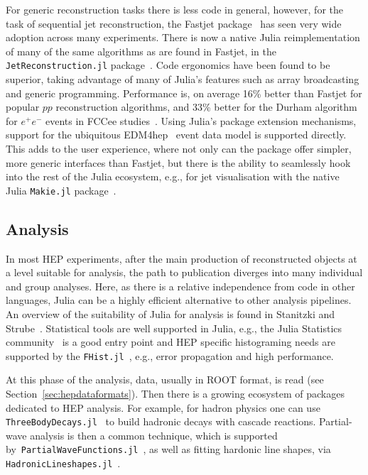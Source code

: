 \documentclass{webofc}
\begin{document}
For generic reconstruction tasks there is less code in general, however, for the
task of sequential jet reconstruction, the Fastjet
package~\cite{Cacciari:2011ma} has seen very wide adoption across many
experiments. There is now a native Julia reimplementation of many of the same
algorithms as are found in Fastjet, in the \texttt{JetReconstruction.jl}
package~\cite{polyglot-jets-conference,stewart_2025_14945660}. Code ergonomics
have been found to be superior, taking advantage of many of Julia's features
such as array broadcasting and generic programming. Performance is, on average
16\% better than Fastjet for popular $pp$ reconstruction algorithms, and 33\%
better for the Durham algorithm for $e^+e^-$ events in FCCee
studies~\cite{fast-jet-reco-julia}. Using Julia's package extension mechanisms,
support for the ubiquitous EDM4hep~\cite{Gaede:2022leb} event data model is
supported directly. This adds to the user experience, where not only can the
package offer simpler, more generic interfaces than Fastjet, but there is the
ability to seamlessly hook into the rest of the Julia ecosystem, e.g., for jet
visualisation with the native Julia \texttt{Makie.jl}
package~\cite{Danisch2021}.

\subsection{Analysis}

In most HEP experiments, after the main production of reconstructed objects at a
level suitable for analysis, the path to publication
diverges into many individual and group analyses. Here, as
there is a relative independence from code in other languages, Julia can be a
highly efficient alternative to other analysis pipelines. An overview of the
suitability of Julia for analysis is found in Stanitzki and
Strube~\cite{Stanitzki:2020bnx}. Statistical tools are well
supported in Julia, e.g., the Julia Statistics community~\cite{JuliaStats} is a
good entry point and HEP specific histograming needs are supported by the
\texttt{FHist.jl}~\cite{Ling_FHist_jl_Fast_and_2023}, e.g., error propagation
and high performance.

At this phase of the analysis, data, usually in ROOT format, is read (see
Section~\ref{sec:hepdataformats}). Then there is a growing
ecosystem of packages dedicated to HEP analysis. For example, for hadron physics
one can use \texttt{ThreeBodyDecays.jl}~\cite{Mikhasenko_ThreeBodyDecays_jl} to
build hadronic decays with cascade reactions. Partial-wave analysis is then a
common technique, which is supported
by~\texttt{PartialWaveFunctions.jl}~\cite{Mikhasenko_PartialWaveFunctions_jl},
as well as fitting hardonic line shapes, via
\texttt{HadronicLineshapes.jl}~\cite{HadronicLineshapes.jl}.
\end{document}
